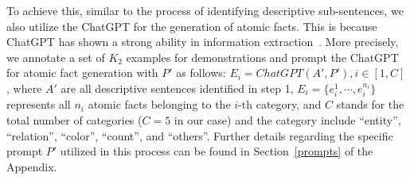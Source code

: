 
To achieve this, similar to the process of identifying descriptive sub-sentences, we also utilize the ChatGPT for the generation of atomic facts. This is because ChatGPT has shown a strong ability in information extraction~\cite{DBLP:journals/corr/abs-2302-10205}. More precisely, we annotate a set of $K_2$ examples for demonstrations and prompt the ChatGPT for atomic fact generation with $P'$ as follows:
${E_i}= ChatGPT (A', P'), i \in [1,C]$, 
where $A'$ are all descriptive sentences identified in step 1, 
${E_i}=\{e_i^1,\cdots,e_i^{n_i}\}$ represents all $n_i$ atomic facts belonging to the $i$-th category, and $C$ stands for the total number of categories (\ie $C=5$ in our case) \textcolor[rgb]{0,0,0}{and the category include ``entity'', ``relation'', ``color'', ``count'', and ``others''}. 
Further details regarding the specific prompt $P'$ utilized in this process can be found in Section~\ref{prompts} of the Appendix.


